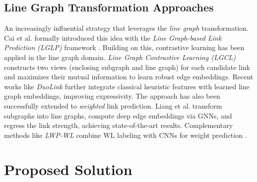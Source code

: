 \documentclass[pdflatex,sn-mathphys-num]{sn-jnl}%
\theoremstyle{thmstyleone}%
\theoremstyle{thmstyletwo}%
\theoremstyle{thmstylethree}%
\theoremstyle{plain} %
\theoremstyle{definition} %
\theoremstyle{remark} %
\theoremstyle{plain} %
\begin{document}
\subsection{Line Graph Transformation Approaches}
An increasingly influential strategy that leverages the \emph{line graph} transformation.
 Cai et al. formally introduced this idea with the \textit{Line Graph-based Link Prediction (LGLP)} framework \cite{cai2021line}. 
 Building on this, contrastive learning has been applied in the line graph domain. 
 \textit{Line Graph Contrastive Learning (LGCL)} \cite{zhang2023line} constructs two views (enclosing subgraph and line graph) for each candidate link and maximizes their mutual information to learn robust edge embeddings. 
 Recent works like \textit{DuoLink} \cite{Tola2025DuoLink} further integrate classical heuristic features with learned line graph embeddings, improving expressivity. 
 The approach has also been successfully extended to \textit{weighted} link prediction. 
 Liang et al. \cite{liang2023line} transform subgraphs into line graphs, compute deep edge embeddings via GNNs, and regress the link strength, achieving state-of-the-art results. 
 Complementary methods like \textit{LWP-WL} combine WL labeling with CNNs for weight prediction \cite{Zulaika2022LWPWL}.









\section{Proposed Solution}
\label{sec:methodology}
\end{document}
